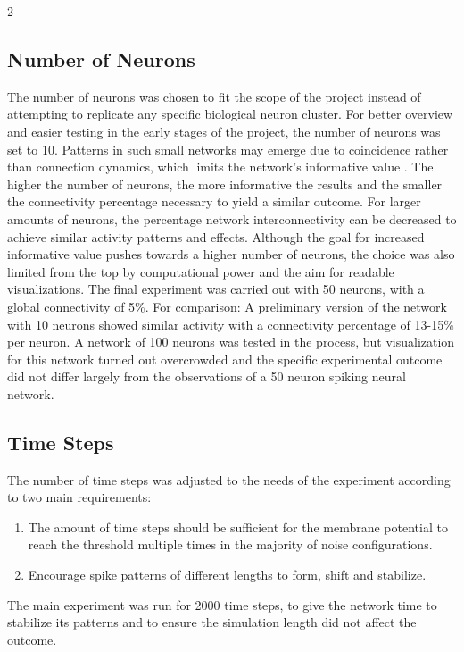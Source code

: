 \documentclass[12pt,a4paper]{article}
\begin{document}
\begin{multicols}{2}
        \subsection{Number of Neurons}
            The number of neurons was chosen to fit the scope of the project instead of attempting to replicate any specific biological neuron cluster. For better overview and easier testing in the early stages of the project, the number of neurons was set to 10. Patterns in such small networks may emerge due to coincidence rather than connection dynamics, which limits the network's informative value \cite{AF}. The higher the number of neurons, the more informative the results and the smaller the connectivity percentage necessary to yield a similar outcome. For larger amounts of neurons, the percentage network interconnectivity can be decreased to achieve similar activity patterns and effects. Although the goal for increased informative value pushes towards a higher number of neurons, the choice was also limited from the top by computational power and the aim for readable visualizations. The final experiment was carried out with 50 neurons, with a global connectivity of 5\%. For comparison: A preliminary version of the network with 10 neurons showed similar activity with a connectivity percentage of 13-15\% per neuron. A network of 100 neurons was tested in the process, but visualization for this network turned out overcrowded and the specific experimental outcome did not differ largely from the observations of a 50 neuron spiking neural network.
            
        \subsection{Time Steps}
            The number of time steps was adjusted to the needs of the experiment according to two main requirements:
            \begin{enumerate}[label=(\arabic*), leftmargin=*, rightmargin=1em, itemsep=10pt, parsep=0pt, topsep=10pt, partopsep=0pt]
                \item\label{timesteps1} The amount of time steps should be sufficient for the membrane potential to reach the threshold multiple times in the majority of noise configurations.
                \item\label{timesteps2} Encourage spike patterns of different lengths to form, shift and stabilize.
            \end{enumerate}
            The main experiment was run for 2000 time steps, to give the network time to stabilize its patterns and to ensure the simulation length did not affect the outcome.
            

\end{multicols}
\end{document}
